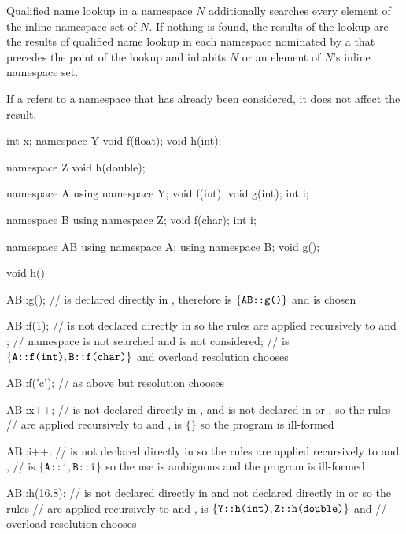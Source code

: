 \pnum
Qualified name lookup in a namespace $N$ additionally searches
every element of the inline namespace set of $N$.
If nothing is found,
the results of the lookup are the results of qualified name lookup
in each namespace nominated by a 
that precedes the point of the lookup and
inhabits $N$ or an element of $N$'s inline namespace set.
\begin{note}
If a  refers to a namespace
that has already been considered, it does not affect the result.
\end{note}
\begin{example}
\begin{codeblock}
int x;
namespace Y {
  void f(float);
  void h(int);
}

namespace Z {
  void h(double);
}

namespace A {
  using namespace Y;
  void f(int);
  void g(int);
  int i;
}

namespace B {
  using namespace Z;
  void f(char);
  int i;
}

namespace AB {
  using namespace A;
  using namespace B;
  void g();
}

void h()
{
  AB::g();      //  is declared directly in , therefore  is $\{ \tcode{AB::g()} \}$ and  is chosen

  AB::f(1);     //  is not declared directly in  so the rules are applied recursively to  and ;
                // namespace  is not searched and  is not considered;
                //  is $\{ \tcode{A::f(int)}, \tcode{B::f(char)} \}$ and overload resolution chooses 

  AB::f('c');   // as above but resolution chooses 

  AB::x++;      //  is not declared directly in , and is not declared in  or , so the rules
                // are applied recursively to  and ,  is $\{ \}$ so the program is ill-formed

  AB::i++;      //  is not declared directly in  so the rules are applied recursively to  and ,
                //  is $\{ \tcode{A::i}, \tcode{B::i} \}$ so the use is ambiguous and the program is ill-formed

  AB::h(16.8);  //  is not declared directly in  and not declared directly in  or  so the rules
                // are applied recursively to  and ,  is $\{ \tcode{Y::h(int)}, \tcode{Z::h(double)} \}$ and
                // overload resolution chooses 
}
\end{codeblock}
\end{example}

